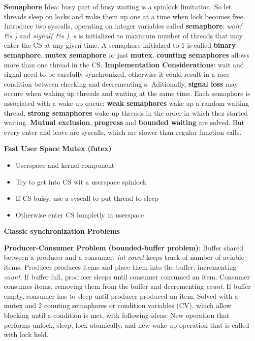 \documentclass[11pt,a4paper]{article}
\begin{document}
	\textbf{Semaphore} \newline
	Idea: busy part of busy waiting is a spinlock limitation. So let threads sleep on locks and wake them up one at a time when lock becomes free. \newline
	Introduce two syscalls, operating on integer variables called \textbf{semaphore}: \textit{wait( \&s )} and \textit{signal( \&s )}. \textit{s} is initialized to maximum number of threads that may enter the CS at any given time. A semaphore initialzed to 1 is called \textbf{binary semaphore}, \textbf{mutex semaphore} or just \textbf{mutex}. \textbf{counting semaphores} allows more than one thread in the CS. \newline
	\textbf{Implementation Considerations}: wait and signal need to be carefully synchronized, otherwise it could result in a race condition between checking and decrementing s. Aditionally, \textbf{signal loss} may occure when waking up threads and waiting at the same time. Each semaphore is associated with a wake-up queue: \textbf{weak semaphores} wake up a random waiting thread, \textbf{strong semaphores} wake up threads in the order in which thez started waiting. \newline
	\textbf{Mutual exclusion}, \textbf{progress} and \textbf{bounded waiting} are solved. But every enter and leave are syscalls, which are slower than regular function calls. \newline
	
	\textbf{Fast User Space Mutex (futex)}
	\begin{itemize}
		\item Userspace and kernel component
		\item Try to get into CS wit a userspace spinlock
		\item If CS buisy, use a syscall to put thread to sleep
		\item Otherwise enter CS lompletly in userspace
	\end{itemize}

	\textbf{Classic synchronization Problems} \newline
	
	\textbf{Producer-Consumer Problem (bounded-buffer problem)}: Buffer shared between a producer and a consumer. \textit{int count} keeps track of number of aviable items. Producer produces items and place them into the buffer, incrementing \textit{count}. If buffer full, producer sleeps until consumer consumed an item. Consumer consumes items, removing them from the buffer and decrementing \textit{count}. If buffer empty, consumer has to sleep until producer produced an item. Solved with a mutex and 2 counting semaphores or condition variables (CV), which allow blocking until a condition is met, with following ideas: New operation that performs unlock, sleep, lock atomically, and new wake-up operation that is called with lock held. \newline
	
\end{document}
